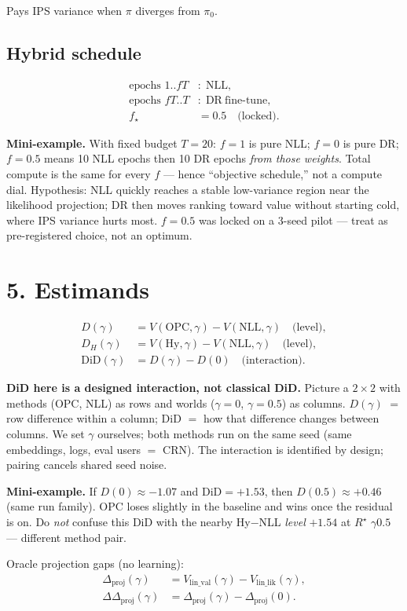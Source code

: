 \documentclass[11pt]{article}
\newcommand{\phonesection}[1]{\Needspace{8\baselineskip}\section*{#1}}
\newcommand{\phonesub}[1]{\Needspace{6\baselineskip}\subsection*{#1}}
\newcommand{\Rstar}{R^{\star}}
\newcommand{\Dproj}{\Delta_{\mathrm{proj}}}
\newcommand{\DDproj}{\Delta\Delta_{\mathrm{proj}}}
\newcommand{\miniex}[1]{\par{\footnotesize\color{black!70}\textbf{Mini-example.} #1\par}}
\begin{document}
Pays IPS variance when $\pi$ diverges from
$\pi_{0}$.

\phonesub{Hybrid schedule}
\begin{align*}
\text{epochs }1..fT &:\;\mathrm{NLL},\\
\text{epochs }fT..T &:\;\mathrm{DR\ fine\text{-}tune},\\
f_{\star} &= 0.5\quad\text{(locked)}.
\end{align*}

\miniex{With fixed budget $T{=}20$: $f{=}1$
is pure NLL; $f{=}0$ is pure DR; $f{=}0.5$
means 10 NLL epochs then 10 DR epochs
\emph{from those weights}.  Total compute
is the same for every $f$ --- hence
``objective schedule,'' not a compute dial.
Hypothesis: NLL quickly reaches a stable
low-variance region near the likelihood
projection; DR then moves ranking toward
value without starting cold, where IPS
variance hurts most.  $f{=}0.5$ was locked
on a 3-seed pilot --- treat as
pre-registered choice, not an optimum.}

\phonesection{5. Estimands}

\begin{align*}
D(\gamma)
  &= V(\mathrm{OPC},\gamma)
   - V(\mathrm{NLL},\gamma)
   \quad\text{(level)},\\
D_{H}(\gamma)
  &= V(\mathrm{Hy},\gamma)
   - V(\mathrm{NLL},\gamma)
   \quad\text{(level)},\\
\mathrm{DiD}(\gamma)
  &= D(\gamma)-D(0)
   \quad\text{(interaction)}.
\end{align*}

\textbf{DiD here is a designed interaction,
not classical DiD.}  Picture a $2\times 2$
with methods (OPC, NLL) as rows and worlds
($\gamma{=}0$, $\gamma{=}0.5$) as columns.
$D(\gamma)$ $=$ row difference within a
column; DiD $=$ how that difference changes
between columns.  We set $\gamma$ ourselves;
both methods run on the same seed (same
embeddings, logs, eval users $=$ CRN).  The
interaction is identified by design; pairing
cancels shared seed noise.

\miniex{If $D(0)\approx -1.07$ and
$\mathrm{DiD}=+1.53$, then
$D(0.5)\approx +0.46$ (same run family).
OPC loses slightly in the baseline and wins
once the residual is on.  Do \emph{not}
confuse this DiD with the nearby Hy$-$NLL
\emph{level} $+1.54$ at $\Rstar$ $\gamma0.5$
--- different method pair.}

Oracle projection gaps (no learning):
\begin{align*}
\Dproj(\gamma)
  &= V_{\mathrm{lin\_val}}(\gamma)
   - V_{\mathrm{lin\_lik}}(\gamma),\\
\DDproj(\gamma)
  &= \Dproj(\gamma)-\Dproj(0).
\end{align*}
\end{document}

